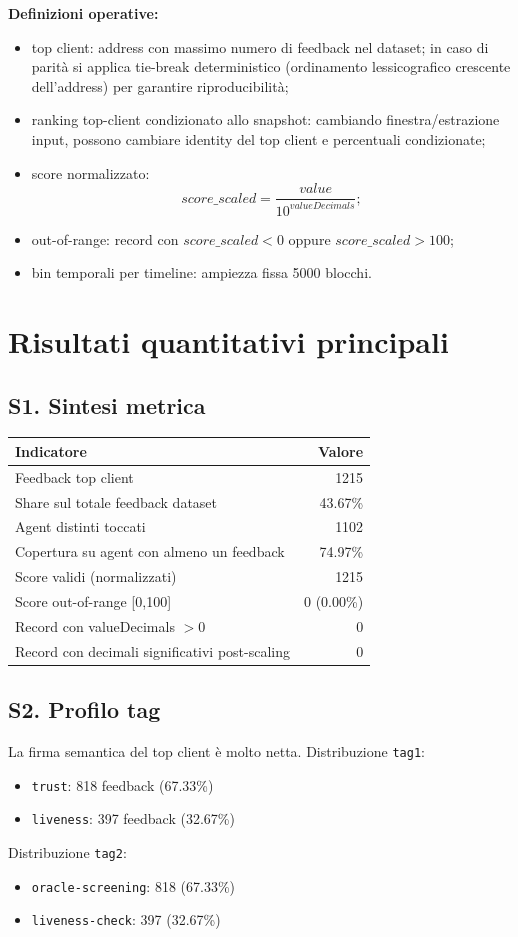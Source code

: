 \documentclass[11pt,a4paper]{article}
\begin{document}
\textbf{Definizioni operative:}
\begin{itemize}
  \item top client: address con massimo numero di feedback nel dataset; in caso di parità si applica tie-break deterministico (ordinamento lessicografico crescente dell'address) per garantire riproducibilità;
  \item ranking top-client condizionato allo snapshot: cambiando finestra/estrazione input, possono cambiare identity del top client e percentuali condizionate;
  \item score normalizzato:
  \[
  score\_scaled = \frac{value}{10^{valueDecimals}};
  \]
  \item out-of-range: record con \(score\_scaled<0\) oppure \(score\_scaled>100\);
  \item bin temporali per timeline: ampiezza fissa 5000 blocchi.
\end{itemize}

\section{Risultati quantitativi principali}
\subsection*{S1. Sintesi metrica}
\begin{center}
\begin{tabular}{|p{10.4cm}|r|}
\hline
\textbf{Indicatore} & \textbf{Valore} \\
\hline
Feedback top client & 1215 \\
\hline
Share sul totale feedback dataset & 43.67\% \\
\hline
Agent distinti toccati & 1102 \\
\hline
Copertura su agent con almeno un feedback & 74.97\% \\
\hline
Score validi (normalizzati) & 1215 \\
\hline
Score out-of-range [0,100] & 0 (0.00\%) \\
\hline
Record con valueDecimals $>0$ & 0 \\
\hline
Record con decimali significativi post-scaling & 0 \\
\hline
\end{tabular}
\end{center}

\subsection*{S2. Profilo tag}
La firma semantica del top client è molto netta.
Distribuzione \texttt{tag1}:
\begin{itemize}
  \item \texttt{trust}: 818 feedback (67.33\%)
  \item \texttt{liveness}: 397 feedback (32.67\%)
\end{itemize}
Distribuzione \texttt{tag2}:
\begin{itemize}
  \item \texttt{oracle-screening}: 818 (67.33\%)
  \item \texttt{liveness-check}: 397 (32.67\%)
\end{itemize}
\end{document}
